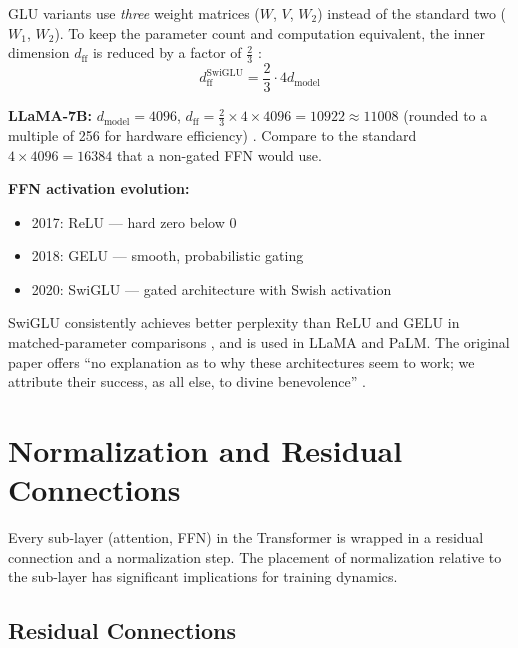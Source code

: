 \documentclass[11pt,a4paper]{article}
\newcommand{\dmodel}{d_{\text{model}}}
\newcommand{\dff}{d_{\text{ff}}}
\begin{document}
GLU variants use \emph{three} weight matrices ($W$, $V$, $W_2$) instead of the
standard two ($W_1$, $W_2$). To keep the parameter count and computation equivalent, the
inner dimension $\dff$ is reduced by a factor of $\frac{2}{3}$ \cite{shazeer2020}:
\begin{equation}
  \dff^{\text{SwiGLU}} = \frac{2}{3} \cdot 4\dmodel
\end{equation}

\begin{dimbox}
\textbf{LLaMA-7B:} $\dmodel = 4096$, $\dff = \frac{2}{3} \times 4 \times 4096 = 10922
\approx 11008$ (rounded to a multiple of 256 for hardware efficiency) \cite{touvron2023}.
Compare to the standard $4 \times 4096 = 16384$ that a non-gated FFN would use.
\end{dimbox}

\begin{evobox}
\textbf{FFN activation evolution:}
\begin{itemize}[nosep]
  \item 2017: ReLU \cite{vaswani2017} --- hard zero below 0
  \item 2018: GELU \cite{radford2018} --- smooth, probabilistic gating
  \item 2020: SwiGLU \cite{shazeer2020} --- gated architecture with Swish activation
\end{itemize}
SwiGLU consistently achieves better perplexity than ReLU and GELU in matched-parameter
comparisons \cite{shazeer2020}, and is used in LLaMA \cite{touvron2023} and PaLM. The
original paper offers ``no explanation as to why these architectures seem to work;
we attribute their success, as all else, to divine benevolence'' \cite{shazeer2020}.
\end{evobox}


\section{Normalization and Residual Connections}
\label{sec:norm-residual}

Every sub-layer (attention, FFN) in the Transformer is wrapped in a residual connection
and a normalization step. The placement of normalization relative to the sub-layer has
significant implications for training dynamics.

\subsection{Residual Connections}
\end{document}
